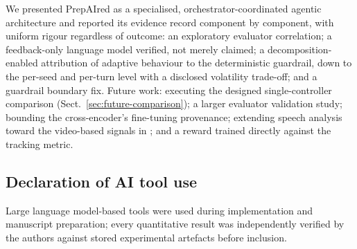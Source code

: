 \documentclass[runningheads]{llncs}
\begin{document}
We presented PrepAIred as a specialised, orchestrator-coordinated agentic architecture and reported its evidence record component by component, with uniform rigour regardless of outcome: an exploratory evaluator correlation; a feedback-only language model verified, not merely claimed; a decomposition-enabled attribution of adaptive behaviour to the deterministic guardrail, down to the per-seed and per-turn level with a disclosed volatility trade-off; and a guardrail boundary fix. Future work: executing the designed single-controller comparison (Sect.~\ref{sec:future-comparison}); a larger evaluator validation study; bounding the cross-encoder's fine-tuning provenance; extending speech analysis toward the video-based signals in \cite{key14,key15}; and a reward trained directly against the tracking metric.

\subsection*{Declaration of AI tool use} Large language model-based tools were used during implementation and manuscript preparation; every quantitative result was independently verified by the authors against stored experimental artefacts before inclusion.



\end{document}

